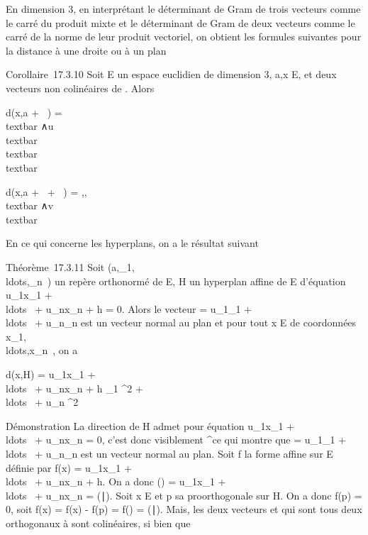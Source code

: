 \documentclass[]{article}
\begin{document}
En dimension 3, en interprétant le déterminant de Gram de trois vecteurs
comme le carré du produit mixte et le déterminant de Gram de deux
vecteurs comme le carré de la norme de leur produit vectoriel, on
obtient les formules suivantes pour la distance à une droite ou à un
plan

Corollaire~17.3.10 Soit E un espace euclidien de dimension 3, a,x \in E,
\overrightarrowu et
\overrightarrowv deux vecteurs non colinéaires de
\overrightarrowE. Alors

d(x,a + ~\overrightarrowu) =
\\textbar{}\overrightarrowax
∧\overrightarrow u\\textbar{}
\over
\\textbar{}\overrightarrowu\\textbar{}

d(x,a + ~\overrightarrowu +
~\overrightarrowv) = \Big
\textbar{}{[}\overrightarrowax,\overrightarrowu,\overrightarrowv{]}\Big
\textbar{} \over
\\textbar{}\overrightarrowu
∧\overrightarrow v\\textbar{}

En ce qui concerne les hyperplans, on a le résultat suivant

Théorème~17.3.11 Soit
(a,\vece\_1,\\ldots,\vece\_n~)
un repère orthonormé de E, H un hyperplan affine de E d'équation
u\_1x\_1 +
\\ldots~ +
u\_nx\_n + h = 0. Alors le vecteur
\overrightarrown =
u\_1\vece\_1 +
\\ldots~ +
u\_n\vece\_n est un vecteur normal au
plan et pour tout x \in E de coordonnées
x\_1,\\ldots,x\_n~,
on a

d(x,H) = \textbar{}u\_1x\_1 +
\\ldots~ +
u\_nx\_n + h\textbar{} \over
\sqrtu\_1 ^2  +
\\ldots~ +
u\_n ^2

Démonstration La direction \overrightarrowH de H
admet pour équation u\_1x\_1 +
\\ldots~ +
u\_nx\_n = 0, c'est donc visiblement
\overrightarrown^\bot ce qui montre que
\overrightarrown =
u\_1\vece\_1 +
\\ldots~ +
u\_n\vece\_n est un vecteur normal au
plan. Soit f la forme affine sur E définie par f(x) =
u\_1x\_1 +
\\ldots~ +
u\_nx\_n + h. On a donc
\vecf(\overrightarrow\xi) =
u\_1x\_1 +
\\ldots~ +
u\_nx\_n =
(\overrightarrow\xi∣\overrightarrown).
Soit x \in E et p sa pro\jmathection orthogonale sur H. On a donc f(p) = 0,
soit f(x) = f(x) - f(p) =\vec
f(\overrightarrowpx) =
(\overrightarrowpx∣\overrightarrown).
Mais, les deux vecteurs \overrightarrowpx et
\overrightarrown qui sont tous deux orthogonaux à
\overrightarrowH sont colinéaires, si bien que
\end{document}
